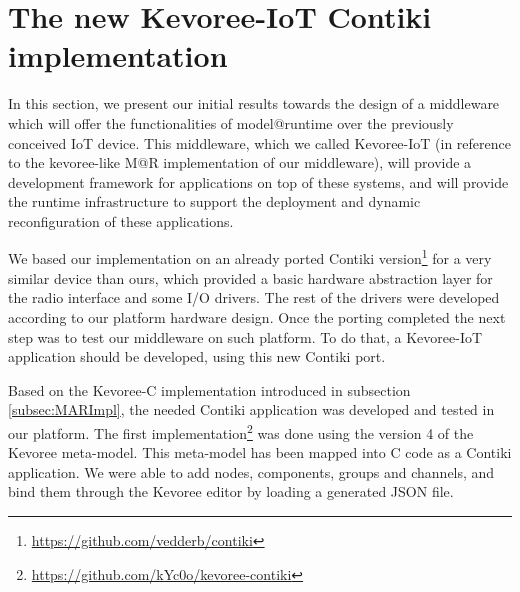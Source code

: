 \section{The new Kevoree-IoT Contiki implementation}
\label{subsec:kevoreeContikiImpl}
In this section, we present our initial results towards the design of a middleware which will offer the functionalities of model@runtime over the previously conceived IoT device. 
This middleware, which we called Kevoree-IoT (in reference to the kevoree-like M@R implementation of our middleware), will provide a development framework for applications on top of these systems, and will provide the runtime infrastructure to support the deployment and dynamic reconfiguration of these applications.

We based our implementation on an already ported Contiki version\footnote{\url{https://github.com/vedderb/contiki}} for a very similar device than ours, which provided a basic hardware abstraction layer for the radio interface and some I/O drivers.
The rest of the drivers were developed according to our platform hardware design.
Once the porting completed the next step was to test our middleware on such platform.
To do that, a Kevoree-IoT application should be developed, using this new Contiki port.




Based on the Kevoree-C implementation introduced in subsection \ref{subsec:MARImpl}, the needed Contiki application was developed and tested in our platform.
The first implementation\footnote{\url{https://github.com/kYc0o/kevoree-contiki}} was done using the version 4 of the Kevoree meta-model.
This meta-model has been mapped into C code as a Contiki application.
We were able to add nodes, components, groups and channels, and bind them through the Kevoree editor by loading a generated JSON file.

